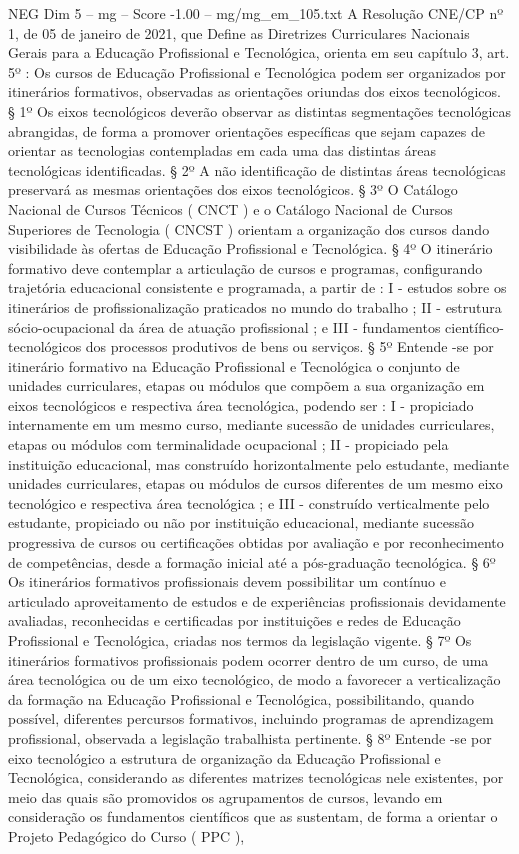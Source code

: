 \begin{textsample}{NEG Dim 5 – mg – Score -1.00 – mg/mg\_em\_105.txt}
A Resolução CNE/CP nº 1, de 05 de janeiro de 2021, que Define as Diretrizes Curriculares Nacionais Gerais para a Educação Profissional e Tecnológica, orienta em seu capítulo 3, art. 5º : Os cursos de Educação Profissional e Tecnológica podem ser organizados por itinerários formativos, observadas as orientações oriundas dos eixos tecnológicos. § 1º Os eixos tecnológicos deverão observar as distintas segmentações tecnológicas abrangidas, de forma a promover orientações específicas que sejam capazes de orientar as tecnologias contempladas em cada uma das distintas áreas tecnológicas identificadas. § 2º A não identificação de distintas áreas tecnológicas preservará as mesmas orientações dos eixos tecnológicos. § 3º O Catálogo Nacional de Cursos Técnicos ( CNCT ) e o Catálogo Nacional de Cursos Superiores de Tecnologia ( CNCST ) orientam a organização dos cursos dando visibilidade às ofertas de Educação Profissional e Tecnológica. § 4º O itinerário formativo deve contemplar a articulação de cursos e programas, configurando trajetória educacional consistente e programada, a partir de : I - estudos sobre os itinerários de profissionalização praticados no mundo do trabalho ; II - estrutura sócio-ocupacional da área de atuação profissional ; e III - fundamentos científico-tecnológicos dos processos produtivos de bens ou serviços. § 5º Entende -se por itinerário formativo na Educação Profissional e Tecnológica o conjunto de unidades curriculares, etapas ou módulos que compõem a sua organização em eixos tecnológicos e respectiva área tecnológica, podendo ser : I - propiciado internamente em um mesmo curso, mediante sucessão de unidades curriculares, etapas ou módulos com terminalidade ocupacional ; II - propiciado pela instituição educacional, mas construído horizontalmente pelo estudante, mediante unidades curriculares, etapas ou módulos de cursos diferentes de um mesmo eixo tecnológico e respectiva área tecnológica ; e III - construído verticalmente pelo estudante, propiciado ou não por instituição educacional, mediante sucessão progressiva de cursos ou certificações obtidas por avaliação e por reconhecimento de competências, desde a formação inicial até a pós-graduação tecnológica. § 6º Os itinerários formativos profissionais devem possibilitar um contínuo e articulado aproveitamento de estudos e de experiências profissionais devidamente avaliadas, reconhecidas e certificadas por instituições e redes de Educação Profissional e Tecnológica, criadas nos termos da legislação vigente. § 7º Os itinerários formativos profissionais podem ocorrer dentro de um curso, de uma área tecnológica ou de um eixo tecnológico, de modo a favorecer a verticalização da formação na Educação Profissional e Tecnológica, possibilitando, quando possível, diferentes percursos formativos, incluindo programas de aprendizagem profissional, observada a legislação trabalhista pertinente. § 8º Entende -se por eixo tecnológico a estrutura de organização da Educação Profissional e Tecnológica, considerando as diferentes matrizes tecnológicas nele existentes, por meio das quais são promovidos os agrupamentos de cursos, levando em consideração os fundamentos científicos que as sustentam, de forma a orientar o Projeto Pedagógico do Curso ( PPC ), 
\end{textsample}
